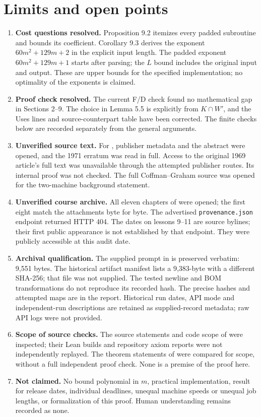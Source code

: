 \documentclass[11pt,a4paper]{article}
\theoremstyle{plain}
\theoremstyle{definition}
\newcommand{\fixedhead}[1]{\section*{#1}}
\begin{document}
\fixedhead{Limits and open points}
\begin{enumerate}[leftmargin=*,itemsep=3pt]
\item \textbf{Cost questions resolved.} Proposition 9.2 itemizes every padded subroutine and bounds its coefficient. Corollary 9.3 derives the exponent $60m^2+129m+2$ in the explicit input length. The padded exponent $60m^2+129m+1$ starts after parsing; the $L$ bound includes the original input and output. These are upper bounds for the specified implementation; no optimality of the exponents is claimed.
\item \textbf{Proof check resolved.} The current F/D check found no mathematical gap in Sections 2--9. The choice in Lemma 5.5 is explicitly from $K\cap W'$, and the Uses lines and source-counterpart table have been corrected. The finite checks below are recorded separately from the general arguments.
\item \textbf{Unverified source text.} For \cite{FKN}, publisher metadata and the abstract were opened, and the 1971 erratum \cite{FKNe} was read in full. Access to the original 1969 article's full text was unavailable through the attempted publisher routes. Its internal proof was not checked. The full Coffman--Graham source \cite[Theorem~1]{CG} was opened for the two-machine background statement.
\item \textbf{Unverified course archive.} All eleven chapters of \cite{L} were opened; the first eight match the attachments byte for byte. The advertised \texttt{provenance.json} endpoint returned HTTP 404. The dates on lessons 9--11 are source bylines; their first public appearance is not established by that endpoint. They were publicly accessible at this audit date.
\item \textbf{Archival qualification.} The supplied prompt in  is preserved verbatim: 9,551 bytes. The historical artifact manifest lists a 9,383-byte  with a different SHA-256; that file was not supplied. The tested newline and BOM transformations do not reproduce its recorded hash. The precise hashes and attempted maps are in the report. Historical run dates, API mode and independent-run descriptions are retained as supplied-record metadata; raw API logs were not provided.
\item \textbf{Scope of source checks.} The source statements and code scope of \cite{F,D} were inspected; their Lean builds and repository axiom reports were not independently replayed. The theorem statements of \cite{J,G} were compared for scope, without a full independent proof check. None is a premise of the proof here.
\item \textbf{Not claimed.} No bound polynomial in $m$, practical implementation, result for release dates, individual deadlines, unequal machine speeds or unequal job lengths, or formalization of this proof. Human understanding remains recorded as none.
\end{enumerate}
\end{document}
